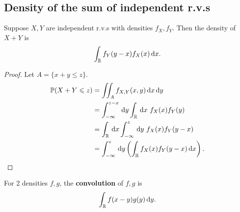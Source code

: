 \subsection{Density of the sum of independent r.v.s}
\begin{proposition}\label{prop:3.10}
    Suppose $ X,Y $ are independent r.v.s with densities $ f_X,f_Y $. Then the density of $ X+Y $ is 
    \[
        \int_{\mathbb{R}} f_Y(y-x)f_X(x)\,\mathrm{d} x .
    \]
\end{proposition}
\begin{proof}
    Let $A=\{x+y\le z\}$.
    \begin{align*}
        \mathbb{P}(X+Y\leqslant z)&=\iint_A f_{X,Y}(x,y)\,\mathrm{d} x\,\mathrm{d} y\\ 
        &= \int_{-\infty}^{z-x} \,\mathrm{d}y \int_{{\mathbb{R}}} \,\mathrm{d}x\ f_X(x)f_Y(y)\\ 
        &= \int_{{\mathbb{R}}} \,\mathrm{d}x \int_{-\infty}^{z} \,\mathrm{d}y\ f_X(x)f_Y(y-x)\\ 
        &= \int_{-\infty}^{z} \,\mathrm{d}y \left( \int_{{\mathbb{R}}} f_X(x)f_Y(y-x)\,\mathrm{d}x \right).\qedhere
    \end{align*}
\end{proof}

\begin{definition}
    For 2 densities $f,g$, the \textbf{convolution} of $f,g$ is 
    \[
        \int_{\mathbb{R}} f(x-y)g(y)\,\mathrm{d} y.
    \]
\end{definition}